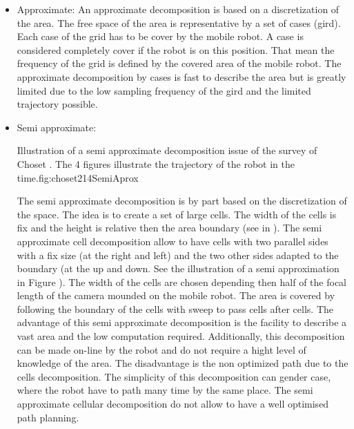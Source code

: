 \begin{itemize}
	\item Approximate: 
		An approximate decomposition is based on a discretization of the area. The free space of the area is representative by a set of cases (gird). Each case of the grid has to be cover by the mobile robot. A case is considered completely cover if the robot is on this position. That mean the frequency of the grid is defined by the covered area of the mobile robot. 
		The approximate decomposition by cases is fast to describe the area but is greatly limited due to the low sampling frequency of the gird and the limited trajectory possible.\\
	 
	\item Semi approximate: 
	 \begin{mfigures}[!]
{Illustration of a semi approximate decomposition issue of the survey  of Choset \citep{214*choset2001}. The 4 figures illustrate the trajectory of the robot in the time.}{fig:choset214SemiAprox} \centering
{}
\hspace{1cm}
\end{mfigures}	
 The semi approximate decomposition is by part based on the discretization of the space. The idea is to create a set of large cells. The width of the cells is fix and the height is relative then the area boundary (see in \citep{214*choset2001}). 
	 The semi approximate cell decomposition allow to have cells with two parallel sides with a fix size (at the right and left) and  the  two other sides adapted to the boundary (at the up and down. See the illustration  of a semi approximation in Figure ).  The width  of  the cells are chosen depending then half of the focal length of the camera mounded on the mobile robot. The area is covered by following the boundary of the cells with sweep to pass cells  after cells.
	 The advantage of this semi approximate decomposition is the facility to describe a vast area and the low computation required. Additionally, this decomposition can be made on-line by the robot and do not require a hight level of knowledge of the area. 
	 The disadvantage is the non optimized path due to the cells decomposition. The simplicity  of this decomposition  can gender case, where the robot have to path many time by the same place. The semi approximate cellular decomposition do not allow to have a well optimised path planning. \\
	 

\end{itemize}
